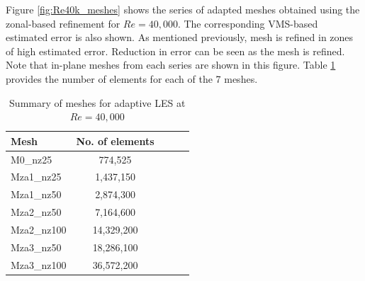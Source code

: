 Figure \ref{fig:Re40k_meshes} shows the series of adapted meshes obtained using the zonal-based refinement for $Re=40,000$. The corresponding VMS-based estimated error is also shown. As mentioned previously, mesh is refined in zones of high estimated error. 
Reduction in error can be seen as the mesh is refined.
Note that in-plane meshes from each series are shown in this figure.
Table \ref{table:adapt_mesh_details_Re40k} provides the number of elements for each of the 7 meshes.

\begin{table}[H]
	\centering
	\caption{Summary of meshes for adaptive LES at $Re=40,000$}
	\label{table:adapt_mesh_details_Re40k}
	\begin{tabular}{|l|c|c|c|c|}
		\hline
		Mesh   & No. of elements \\
		\hline
		M0\_nz25	& 774,525 \\
		\hline
		Mza1\_nz25	& 1,437,150 \\
		\hline		
		Mza1\_nz50 &  2,874,300 \\
		\hline
		Mza2\_nz50  &  7,164,600 \\
		\hline
		Mza2\_nz100  &  14,329,200 \\
		\hline
		Mza3\_nz50  &  18,286,100 \\
		\hline
		Mza3\_nz100  &  36,572,200 \\
		\hline
	\end{tabular}
\end{table}

